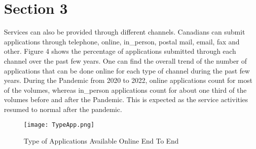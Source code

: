 \section{Section 3}

Services can also be provided through different channels. Canadians can submit applications through telephone, online, 
in\_person, postal mail, email, fax and other. Figure 4 shows the percentage 
of applications submitted through each channel over the past few years. One 
can find the overall trend of the number of applications that can be done 
online for each type of channel during the past few years. During the Pandemic 
from 2020 to 2022, online applications count for most of the volumes, whereas 
in\_person applications count for about one third of the volumes before and 
after the Pandemic. This is expected as the service activities resumed to 
normal after the pandemic.

\begin{figure}
    \centering
    \texttt{[image: TypeApp.png]}
    \caption{\label{fig:TypeApp}Type of Applications Available Online End To End}
\end{figure}
